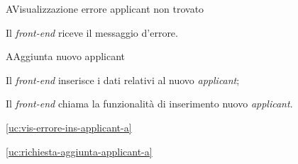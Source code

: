 \begin{usecase}{5}{A}{Visualizzazione errore applicant non trovato}



	\begin{ucscenarioprincipale}
		\item Il \textit{front-end} riceve il messaggio d'errore.
	\end{ucscenarioprincipale}


	\label{uc:vis-errore-applicant-a}

\end{usecase}

\begin{usecase}{6}{A}{Aggiunta nuovo applicant}



	\begin{ucscenarioprincipale}
		\item Il \textit{front-end} inserisce i dati relativi al nuovo \textit{applicant};
		\item Il \textit{front-end} chiama la funzionalità di inserimento nuovo \textit{applicant}.
	\end{ucscenarioprincipale}


	\begin{ucestensioni}
		\item \ref{uc:vis-errore-ins-applicant-a}
	\end{ucestensioni}

	\begin{ucgeneralizzazioni}
		\item \ref{uc:richiesta-aggiunta-applicant-a}
	\end{ucgeneralizzazioni}

	\label{uc:aggiunta-applicant-a}
\end{usecase}

